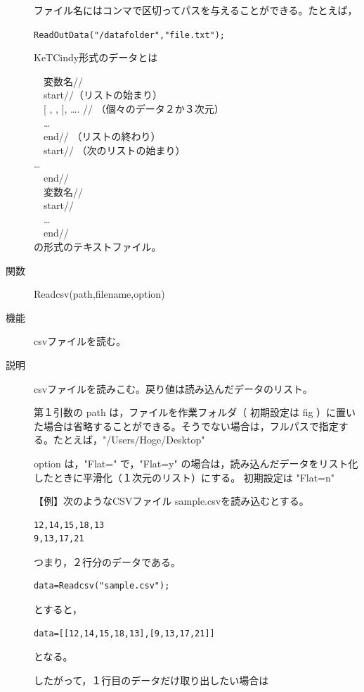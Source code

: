 \documentclass[papersize,a4paper,12pt,uplatex]{jsarticle}
\begin{document}
\begin{description}
ファイル名にはコンマで区切ってパスを与えることができる。たとえば，

\verb|ReadOutData("/datafolder","file.txt"); |

KeTCindy形式のデータとは

　変数名// \\
　start//（リストの始まり） \\
　[ , , ], …. // （個々のデータ２か３次元） \\
　… \\
　end// （リストの終わり） \\
　start// （次のリストの始まり） \\
… \\
　end// \\
　変数名// \\
　start// \\
　… \\
　end// \\

の形式のテキストファイル。

\hypertarget{readcsv}{}
\item[関数]Readcsv(path,filename,option)
\item[機能]csvファイルを読む。
\item[説明]csvファイルを読みこむ。戻り値は読み込んだデータのリスト。

第１引数の path は，ファイルを作業フォルダ（ 初期設定は fig ）に置いた場合は省略することができる。そうでない場合は，フルパスで指定する。たとえば，"/Users/Hoge/Desktop"

option は，"Flat=" で，"Flat=y" の場合は，読み込んだデータをリスト化したときに平滑化（１次元のリスト）にする。 初期設定は "Flat=n"

【例】次のようなCSVファイル sample.csvを読み込むとする。

\begin{verbatim}
12,14,15,18,13
9,13,17,21
\end{verbatim}

つまり，２行分のデータである。

\begin{verbatim}
data=Readcsv("sample.csv");
\end{verbatim}

とすると，
\begin{verbatim}
data=[[12,14,15,18,13],[9,13,17,21]]
\end{verbatim}

となる。

したがって，１行目のデータだけ取り出したい場合は


\end{description}
\end{document}
